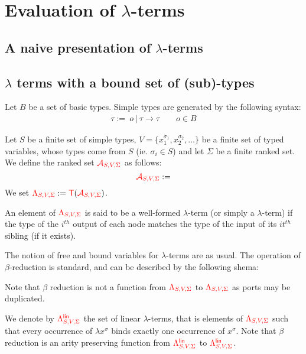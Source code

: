 \section{Evaluation of $\lambda$-terms}
\label{sec:eval}

\subsection{A naive presentation of $\lambda$-terms}

\subsection{$\lambda$ terms with a bound set of (sub)-types}

\begin{definition}
Let $B$ be a set of basic types. Simple types are generated by the following syntax: 
\begin{align*}
\tau:= \ o\ |\  \tau\rightarrow \tau \qquad o\in B
\end{align*}
\end{definition}

\begin{definition}
Let $S$ be a finite set of simple types, $V=\{x_1^{\sigma_1},x_2^{\sigma_2},\dots\}$ be a finite set of typed variables, whose types come from $S$ (ie. $\sigma_i \in S$) and let  $\Sigma$ be a finite ranked set. 
We define the ranked set ${\color{red}{\mathcal{A}_{S,V,\Sigma}}}$ as follows:
 $${\color{red}{\mathcal{A}_{S,V,\Sigma}}}:=$$
We set ${\color{red}{\Lambda_{S,V,\Sigma}}}:={\color{red}{\mathsf T}}({\color{red}{\mathcal{A}_{S,V,\Sigma}}})$. 
\end{definition}
 \newcommand{\rlambda}{\ranked{\Lambda}}
 \newcommand{\rlambdalin}{\ranked{\Lambda^{\sf{lin}}}}
An element of ${\color{red}{\Lambda_{S,V,\Sigma}}}$ is said to be a well-formed $\lambda$-term (or simply a $\lambda$-term) if the type of the $i^{th}$ output of each node matches the type of the input of its $it^{th}$ sibling (if it exists).

The notion of free and bound variables for $\lambda$-terms are as usual. The operation of $\beta$-reduction is standard, and can be described by the following shema:

Note that $\beta$ reduction is not a function from ${\color{red}{\Lambda_{S,V,\Sigma}}}$ to ${\color{red}{\Lambda_{S,V,\Sigma}}}$ as ports may be duplicated. 

We denote by ${\color{red}{\Lambda^{\sf{lin}}_{S,V,\Sigma}}}$ the set of linear $\lambda$-terms, that is elements of ${\color{red}{\Lambda_{S,V,\Sigma}}}$ such that every occurrence of $\lambda x^\sigma$ binds exactly one occurrence of $x^\sigma$. Note that $\beta$ reduction is an arity preserving function from ${\color{red}{\Lambda^{\sf{lin}}_{S,V,\Sigma}}}$ to ${\color{red}{\Lambda^{\sf{lin}}_{S,V,\Sigma}}}$.  

